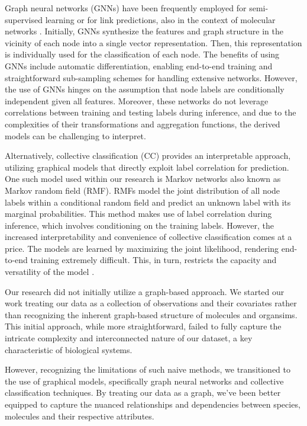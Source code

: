 \documentclass[
11pt, %
oneside, %
english, %
singlespacing, %
headsepline, %
chapterinoneline, %
]{MastersDoctoralThesis} %
\begin{document}
Graph neural networks (GNNs) \cite{wuGraphNeuralNetworks2022} have been frequently employed for semi-supervised learning or for link predictions, also in the context of molecular networks \cite{oyetundeBoostGAPFILLImprovingFidelity2017}. Initially, GNNs synthesize the features and graph structure in the vicinity of each node into a single vector representation. Then, this representation is individually used for the classification of each node. The benefits of using GNNs include automatic differentiation, enabling end-to-end training and straightforward sub-sampling schemes for handling extensive networks. However, the use of GNNs hinges on the assumption that node labels are conditionally independent given all features. Moreover, these networks do not leverage correlations between training and testing labels during inference, and due to the complexities of their transformations and aggregation functions, the derived models can be challenging to interpret.

Alternatively, collective classification (CC) \cite{senCollectiveClassificationNetwork2008} provides an interpretable approach, utilizing graphical models that directly exploit label correlation for prediction. One such model used within our research is Markov networks also known as Markov random field (RMF). RMFs model the joint distribution of all node labels within a conditional random field and predict an unknown label with its marginal probabilities. This method makes use of label correlation during inference, which involves conditioning on the training labels. However, the increased interpretability and convenience of collective classification comes at a price. The models are learned by maximizing the joint likelihood, rendering end-to-end training extremely difficult. This, in turn, restricts the capacity and versatility of the model \cite{jiaGraphBeliefPropagation2021}.

Our research did not initially utilize a graph-based approach. We started our work treating our data as a collection of observations and their covariates rather than recognizing the inherent graph-based structure of molecules and organsims. This initial approach, while more straightforward, failed to fully capture the intricate complexity and interconnected nature of our dataset, a key characteristic of biological systems.

However, recognizing the limitations of such naive methods, we transitioned to the use of graphical models, specifically graph neural networks and collective classification techniques. By treating our data as a graph, we've been better equipped to capture the nuanced relationships and dependencies between species, molecules and their respective attributes.
\end{document}
